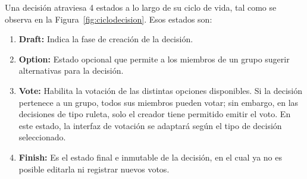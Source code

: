 Una decisión atraviesa 4 estados a lo largo de su ciclo de vida, tal como se observa en la Figura~\ref{fig:ciclodecision}. Esos estados son:
\begin{enumerate}
    \item \textbf{Draft:} Indica la fase de creación de la decisión.
    \item \textbf{Option:} Estado opcional que permite a los miembros de un grupo sugerir alternativas para la decisión.
    \item \textbf{Vote:} Habilita la votación de las distintas opciones disponibles. Si la decisión pertenece a un grupo, todos sus miembros pueden votar; sin embargo, en las decisiones de tipo ruleta, solo el creador tiene permitido emitir el voto. En este estado, la interfaz de votación se adaptará según el tipo de decisión seleccionado.
    \item \textbf{Finish:} Es el estado final e inmutable de la decisión, en el cual ya no es posible editarla ni registrar nuevos votos.
\end{enumerate}    


